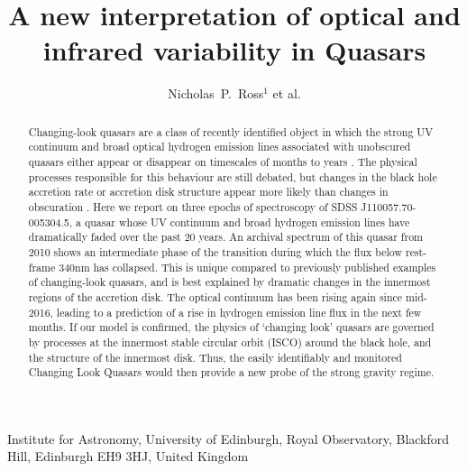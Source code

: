 \documentclass{nature}
\title{A new interpretation of optical and infrared variability in Quasars}
\author{Nicholas~P.~Ross$^{1}$ et al.}
\begin{document}
\maketitle

\begin{affiliations}
  \item Institute for Astronomy, University of Edinburgh, Royal Observatory, Blackford Hill, Edinburgh EH9 3HJ, United Kingdom 
\end{affiliations}


\begin{abstract}
Changing-look quasars are a class of recently identified object in
which the strong UV continuum and broad optical hydrogen emission
lines associated with unobscured quasars either appear or disappear on
timescales of months to years \cite{LaMassa15, Runnoe16, MacLeod16, Ruan16}. The
physical processes responsible for this behaviour are still debated,
but changes in the black hole accretion rate or accretion disk
structure appear more likely than changes in
obscuration \cite{Hutsemekers17, Sheng17}. Here we report on three
epochs of spectroscopy of SDSS J110057.70-005304.5, a quasar whose UV
continuum and broad hydrogen emission lines have dramatically faded
over the past 20 years. An archival spectrum of this quasar from 2010
shows an intermediate phase of the transition during which the flux
below rest-frame 340nm has collapsed. This is unique compared to
previously published examples of changing-look quasars, and is best
explained by dramatic changes in the innermost regions of the
accretion disk. The optical continuum has been rising again since
mid-2016, leading to a prediction of a rise in hydrogen emission line
flux in the next few months. If our model is confirmed, the physics of
`changing look' quasars are governed by processes at the innermost
stable circular orbit (ISCO) around the black hole, and the structure
of the innermost disk. Thus, the easily identifiably and monitored
Changing Look Quasars would then provide a new probe of the strong
gravity regime.
\end{abstract}
\end{document}
